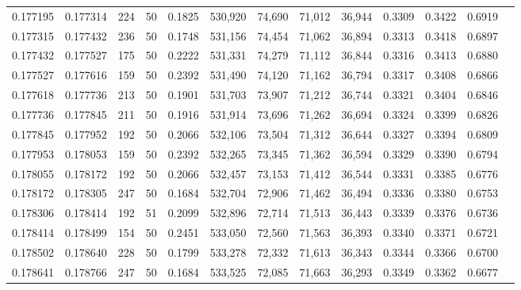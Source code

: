 \begin{tabular}{rrrrrrrrrrrrr}
0.177195 & 0.177314 &   224 &  50 &                                     0.1825 & 530,920 &  74,690 &  71,012 &  36,944 & 0.3309 & 0.3422 & 0.6919 \\
0.177315 & 0.177432 &   236 &  50 &                                     0.1748 & 531,156 &  74,454 &  71,062 &  36,894 & 0.3313 & 0.3418 & 0.6897 \\
0.177432 & 0.177527 &   175 &  50 &                                     0.2222 & 531,331 &  74,279 &  71,112 &  36,844 & 0.3316 & 0.3413 & 0.6880 \\
0.177527 & 0.177616 &   159 &  50 &                                     0.2392 & 531,490 &  74,120 &  71,162 &  36,794 & 0.3317 & 0.3408 & 0.6866 \\
0.177618 & 0.177736 &   213 &  50 &                                     0.1901 & 531,703 &  73,907 &  71,212 &  36,744 & 0.3321 & 0.3404 & 0.6846 \\
0.177736 & 0.177845 &   211 &  50 &                                     0.1916 & 531,914 &  73,696 &  71,262 &  36,694 & 0.3324 & 0.3399 & 0.6826 \\
0.177845 & 0.177952 &   192 &  50 &                                     0.2066 & 532,106 &  73,504 &  71,312 &  36,644 & 0.3327 & 0.3394 & 0.6809 \\
0.177953 & 0.178053 &   159 &  50 &                                     0.2392 & 532,265 &  73,345 &  71,362 &  36,594 & 0.3329 & 0.3390 & 0.6794 \\
0.178055 & 0.178172 &   192 &  50 &                                     0.2066 & 532,457 &  73,153 &  71,412 &  36,544 & 0.3331 & 0.3385 & 0.6776 \\
0.178172 & 0.178305 &   247 &  50 &                                     0.1684 & 532,704 &  72,906 &  71,462 &  36,494 & 0.3336 & 0.3380 & 0.6753 \\
0.178306 & 0.178414 &   192 &  51 &                                     0.2099 & 532,896 &  72,714 &  71,513 &  36,443 & 0.3339 & 0.3376 & 0.6736 \\
0.178414 & 0.178499 &   154 &  50 &                                     0.2451 & 533,050 &  72,560 &  71,563 &  36,393 & 0.3340 & 0.3371 & 0.6721 \\
0.178502 & 0.178640 &   228 &  50 &                                     0.1799 & 533,278 &  72,332 &  71,613 &  36,343 & 0.3344 & 0.3366 & 0.6700 \\
0.178641 & 0.178766 &   247 &  50 &                                     0.1684 & 533,525 &  72,085 &  71,663 &  36,293 & 0.3349 & 0.3362 & 0.6677 \\

\end{tabular}
